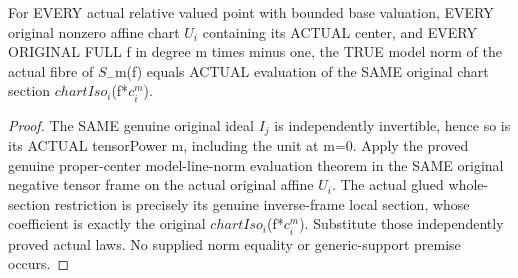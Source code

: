 \begin{theorem}
\label{thm:seven-native-negative-tensor-original-local-norm}
\leanok
For EVERY actual relative valued point with bounded base valuation,
EVERY original nonzero affine chart $U_i$ containing its ACTUAL center,
and EVERY ORIGINAL FULL f in degree m times minus one, the TRUE model
norm of the actual fibre of $S_-$m(f) equals ACTUAL evaluation of the
SAME original chart section $chartIso_i$(f*$c_i^m$).
\end{theorem}
\begin{proof}
The SAME genuine original ideal $I_j$ is independently invertible, hence
so is its ACTUAL tensorPower m, including the unit at m=0. Apply the
proved genuine proper-center model-line-norm evaluation theorem in the
SAME original negative tensor frame on the actual original affine $U_i$.
The actual glued whole-section restriction is precisely its genuine
inverse-frame local section, whose coefficient is exactly the original
$chartIso_i$(f*$c_i^m$). Substitute those independently proved actual laws.
No supplied norm equality or generic-support premise occurs.
\end{proof}

